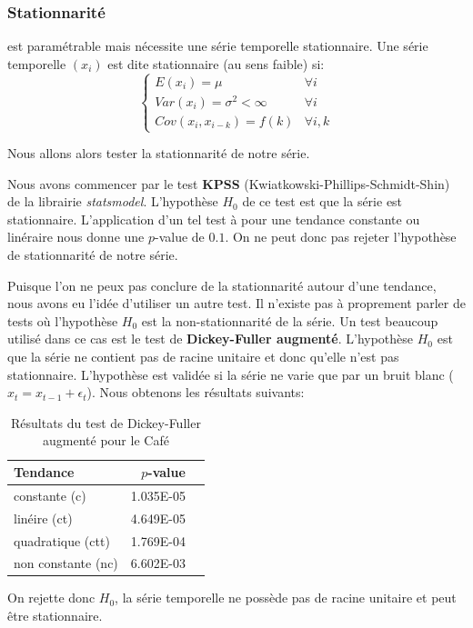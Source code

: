 \subsubsection{Stationnarité}
\label{subsec:stationarity}

\ARIMA est paramétrable mais nécessite une série temporelle stationnaire. Une série temporelle $(x_i)$ est dite stationnaire (au sens faible) si:
\begin{equation}
    \begin{cases}
        E(x_i) = \mu                  & \forall i \\
        Var(x_i) = \sigma^2 < \infty  & \forall i \\
        Cov(x_i, x_{i-k}) = f(k)      & \forall i,k
    \end{cases}
    \label{eq:stationarity}
\end{equation}

Nous allons alors tester la stationnarité de notre série.

Nous avons commencer par le test \textbf{KPSS} (Kwiatkowski-Phillips-Schmidt-Shin) de la librairie \emph{statsmodel}. L'hypothèse $H_0$ de ce test est que la série est stationnaire. L'application d'un tel test à \ts pour une tendance constante ou linéraire nous donne une $p$-value de $0.1$. On ne peut donc pas rejeter l'hypothèse de stationnarité de notre série.

Puisque l'on ne peux pas conclure de la stationnarité autour d'une tendance, nous avons eu l'idée d'utiliser un autre test. Il n'existe pas à proprement parler de tests où l'hypothèse $H_0$ est la non-stationnarité de la série. Un test beaucoup utilisé dans ce cas est le test de \textbf{Dickey-Fuller augmenté}. L'hypothèse $H_0$ est que la série ne contient pas de racine unitaire et donc qu'elle n'est pas stationnaire. L'hypothèse est validée si la série ne varie que par un bruit blanc ($x_t = x_{t-1} + \epsilon_t$).
Nous obtenons les résultats suivants:
\begin{table}[H]
    \centering
    \begin{tabular}{|l|r|l|}
        \hline
        Tendance & $p$-value \\
        \hline
        constante (c)      & 1.035E-05 \\
        linéire (ct)       & 4.649E-05 \\
        quadratique (ctt)  & 1.769E-04 \\
        non constante (nc) & 6.602E-03 \\
        \hline
    \end{tabular}
    \caption{Résultats du test de Dickey-Fuller augmenté pour le Café}
    \label{tab:adf_results_cafe}
\end{table}
On rejette donc $H_0$, la série temporelle ne possède pas de racine unitaire et peut être stationnaire.

